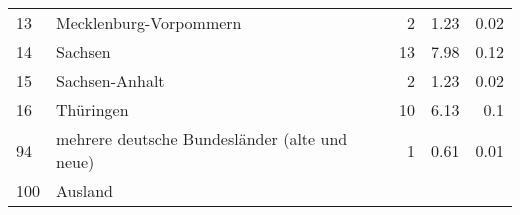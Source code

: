 \begin{longtable}{lXrrr}
     13 &
     \multicolumn{1}{X}{ Mecklenburg-Vorpommern   } &


       \num{2} &
       \num[round-mode=places,round-precision=2]{1,23} &
         \num[round-mode=places,round-precision=2]{0,02} \\

     14 &
     \multicolumn{1}{X}{ Sachsen   } &


       \num{13} &
       \num[round-mode=places,round-precision=2]{7,98} &
         \num[round-mode=places,round-precision=2]{0,12} \\

     15 &
     \multicolumn{1}{X}{ Sachsen-Anhalt   } &


       \num{2} &
       \num[round-mode=places,round-precision=2]{1,23} &
         \num[round-mode=places,round-precision=2]{0,02} \\

     16 &
     \multicolumn{1}{X}{ Thüringen   } &


       \num{10} &
       \num[round-mode=places,round-precision=2]{6,13} &
         \num[round-mode=places,round-precision=2]{0,1} \\

     94 &
     \multicolumn{1}{X}{ mehrere deutsche Bundesländer (alte und neue)   } &


       \num{1} &
       \num[round-mode=places,round-precision=2]{0,61} &
         \num[round-mode=places,round-precision=2]{0,01} \\

     100 &
     \multicolumn{1}{X}{ Ausland   } &



\end{longtable}
